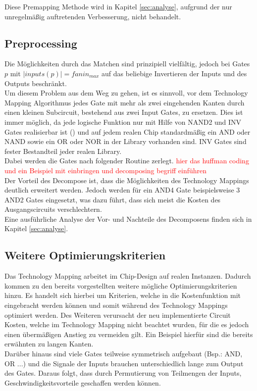 \documentclass[11pt, a4paper, german]{article}
\newcommand{\TM}{Technology  Mapping }
\begin{document}
Diese Premapping Methode wird in Kapitel \ref{sec:analyse}, aufgrund der nur unregelmäßig auftretenden Verbesserung, nicht behandelt.

\subsection{Preprocessing}
Die Möglichkeiten durch das Matchen sind prinzipiell vielfältig, jedoch bei Gates $p$ mit $|inputs(p)| = fanin_{max}$ auf das beliebige Invertieren der Inputs und des Outputs beschränkt. \\
Um diesem Problem aus dem Weg zu gehen, ist es sinnvoll, vor dem \TM Algorithmus jedes Gate mit mehr als zwei eingehenden Kanten durch einen kleinen Subcircuit, bestehend aus zwei Input Gates, zu ersetzen. Dies ist immer möglich, da jede logische Funktion nur mit Hilfe von NAND2 und INV Gates realisierbar ist (\cite{Post}) und auf jedem realen Chip standardmäßig ein AND oder NAND sowie ein OR oder NOR in der Library vorhanden sind. INV Gates sind fester Bestandteil jeder realen Library.\\
Dabei werden die Gates nach folgender Routine zerlegt. \textcolor{red}{hier das huffman coding und ein Beispiel mit einbringen und decomposing begriff einführen}\\
Der Vorteil des Decompose ist, dass die Möglichkeiten des Technology Mappings deutlich erweitert werden. Jedoch werden für ein AND4 Gate beispielsweise 3 AND2 Gates eingesetzt, was dazu führt, dass sich meist die Kosten des Ausgangscircuits verschlechtern.\\
Eine ausführliche Analyse der Vor- und Nachteile des Decomposens finden sich in Kapitel \ref{sec:analyse}.
	

\subsection{Weitere Optimierungskriterien}
\label{sec:weitere_opt_krit}
Das \TM arbeitet im Chip-Design auf realen Instanzen. Dadurch kommen zu den bereits vorgestellten weitere mögliche Optimierungskriterien hinzu. Es handelt sich hierbei um Kriterien, welche in die Kostenfunktion mit eingebracht werden können und somit während des Technology Mappings optimiert werden. Des Weiteren verursacht der neu implementierte Circuit Kosten, welche im \TM nicht beachtet wurden, für die es jedoch einen übermäßigen Anstieg zu vermeiden gilt. Ein Beispiel hierfür sind die bereits erwähnten zu langen Kanten.\\
Darüber hinaus sind viele Gates teilweise symmetrisch aufgebaut (Bsp.: AND, OR ...) und die Signale der Inputs brauchen unterschiedlich lange zum Output des Gates. Daraus folgt, dass durch Permutierung von Teilmengen der Inputs, Geschwindigkeitsvorteile geschaffen werden können.  
\end{document}
